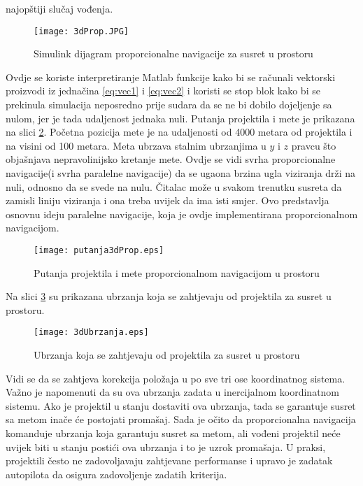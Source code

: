 najopštiji slučaj vođenja. 
\begin{figure}[!ht]
    \centering
    \texttt{[image: 3dProp.JPG]}
    \caption{Simulink dijagram proporcionalne navigacije za susret u prostoru}
    \label{fig:3dPropFull}
\end{figure}
Ovdje se koriste interpretiranje Matlab funkcije kako bi se računali vektorski proizvodi iz jednačina
\ref{eq:vec1} i \ref{eq:vec2} i koristi se stop blok kako bi se prekinula simulacija neposredno prije 
sudara da se ne bi dobilo dojeljenje sa nulom, jer je tada udaljenost jednaka nuli. 
Putanja projektila i mete je prikazana na slici \ref{fig:3dPropPutanja}. Početna pozicija mete je 
na udaljenosti od 4000 metara od projektila i na visini od 100 metara. Meta ubrzava stalnim ubrzanjima 
u $y$ i $z$ pravcu što objašnjava nepravolinijsko kretanje mete. Ovdje se vidi svrha proporcionalne 
navigacije(i svrha paralelne navigacije) da se ugaona brzina ugla viziranja drži na nuli, odnosno 
da se svede na nulu. Čitalac može u svakom trenutku susreta da zamisli liniju viziranja i ona treba uvijek 
da ima isti smjer. Ovo predstavlja osnovnu ideju paralelne navigacije, koja je ovdje implementirana proporcionalnom 
navigacijom. 
\begin{figure}[!ht]
    \centering
    \texttt{[image: putanja3dProp.eps]}
    \caption{Putanja projektila i mete proporcionalnom navigacijom u prostoru}
    \label{fig:3dPropPutanja}
\end{figure}
Na slici \ref{fig:3dUbrz} su prikazana ubrzanja koja se zahtjevaju od projektila za susret u prostoru. 
\begin{figure}[!ht]
    \centering
    \texttt{[image: 3dUbrzanja.eps]}
    \caption{Ubrzanja koja se zahtjevaju od projektila za susret u prostoru}
    \label{fig:3dUbrz}
\end{figure}
Vidi se da se zahtjeva korekcija položaja u po sve tri ose koordinatnog sistema. Važno je napomenuti da 
su ova ubrzanja zadata u inercijalnom koordinatnom sistemu. Ako je projektil u stanju dostaviti ova ubrzanja, tada se garantuje susret sa metom inače će postojati promašaj. Sada je 
očito da proporcionalna navigacija komanduje ubrzanja koja garantuju susret sa metom, ali vođeni 
projektil neće uvijek biti u stanju postići ova ubrzanja i to je uzrok promašaja. U praksi, projektili 
često ne zadovoljavaju zahtjevane performanse i upravo je zadatak autopilota da osigura zadovoljenje zadatih kriterija. 

